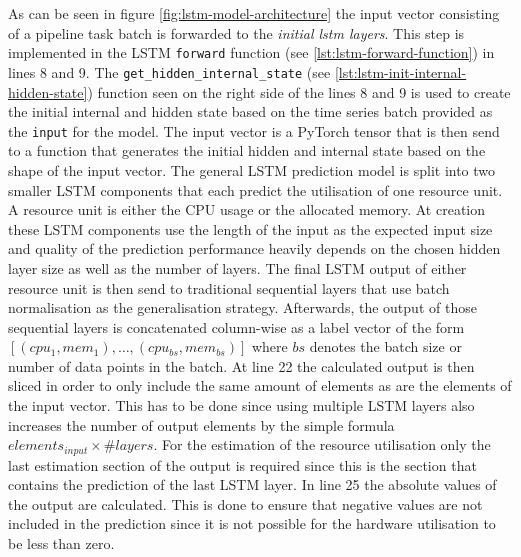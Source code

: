   


  As can be seen in figure \ref{fig:lstm-model-architecture} the input vector consisting of a pipeline task batch is forwarded to the \emph{initial lstm layers}. This step is implemented in the LSTM \texttt{forward} function (see \ref{lst:lstm-forward-function}) in lines 8 and 9. The \texttt{get\_hidden\_internal\_state} (see \ref{lst:lstm-init-internal-hidden-state}) function seen on the right side of the lines 8 and 9 is used to create the initial internal and hidden state based on the time series batch provided as the \texttt{input} for the model. The input vector is a PyTorch tensor that is then send to a function that generates the initial hidden and internal state based on the shape of the input vector.
  The general LSTM prediction model is split into two smaller LSTM components that each predict the utilisation of one resource unit. A resource unit is either the CPU usage or the allocated memory. At creation these LSTM components use the length of the input as the expected input size and quality of the prediction performance heavily depends on the chosen hidden layer size as well as the number of  layers.
  The final LSTM output of either resource unit is then send to traditional sequential layers that use batch normalisation as the generalisation strategy.
  Afterwards, the output of those sequential layers is concatenated column-wise as a label vector of the form $\left[(cpu_1, mem_1), \dots, (cpu_{bs}, mem_{bs})\right]$ where $bs$ denotes the batch size or number of data points in the batch.
  At line 22 the calculated output is then sliced in order to only include the same amount of elements as are the elements of the input vector. This has to be done since using multiple LSTM layers also increases the number of output elements by the simple formula $elements_{input} \times \#layers$. For the estimation of the resource utilisation only the last estimation section of the output is required since this is the section that contains the prediction of the last LSTM layer.
  In line 25 the absolute values of the output are calculated. This is done to ensure that negative values are not included in the prediction since it is not possible for the hardware utilisation to be less than zero.
  
